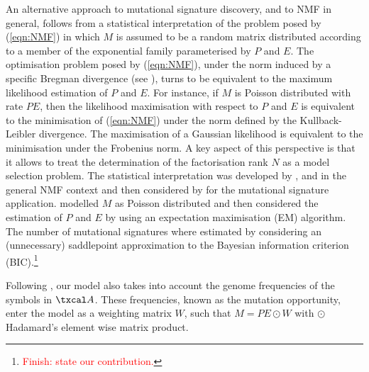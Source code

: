 \documentclass{bioinfo}
\begin{document}
An alternative approach to mutational signature discovery, and to NMF
in general, follows from a statistical interpretation of the problem
posed by (\ref{eqn:NMF}) in which $M$ is assumed to be a random matrix
distributed according to a member of the exponential family
parameterised by $P$ and $E$. The optimisation problem posed by
(\ref{eqn:NMF}), under the norm induced by a specific Bregman
divergence (see \citealp{BMD}), turns to be equivalent to the maximum
likelihood estimation of $P$ and $E$.  For instance, if $M$ is Poisson
distributed with rate $PE$, then the likelihood maximisation with
respect to $P$ and $E$ is equivalent to the minimisation of
(\ref{eqn:NMF}) under the norm defined by the Kullback-Leibler
divergence. The maximisation of a Gaussian likelihood is equivalent to
the minimisation under the Frobenius norm. A key aspect of this
perspective is that it allows to treat the determination of the
factorisation rank $N$ as a model selection problem. The statistical
interpretation was developed by \cite{C}, \cite{FC} and \cite{SWK} in
the general NMF context and then considered by \cite{FICMV} for the
mutational signature application. \cite{FICMV} modelled $M$ as Poisson
distributed and then considered the estimation of $P$ and $E$ by using
an expectation maximisation (EM) algorithm. The number of mutational
signatures where estimated by considering an (unnecessary) saddlepoint
approximation to the Bayesian information criterion
(BIC).\footnote{\textcolor{red}{Finish: state our contribution.}}


Following \cite{FICMV}, our model also takes into account the genome
frequencies of the symbols in $\txcal A$.  These frequencies, known as
the mutation opportunity, enter the model as a weighting matrix $W$, 
such  that $M=PE\odot W$ with $\odot$ Hadamard's element wise matrix
product.

\end{document}
